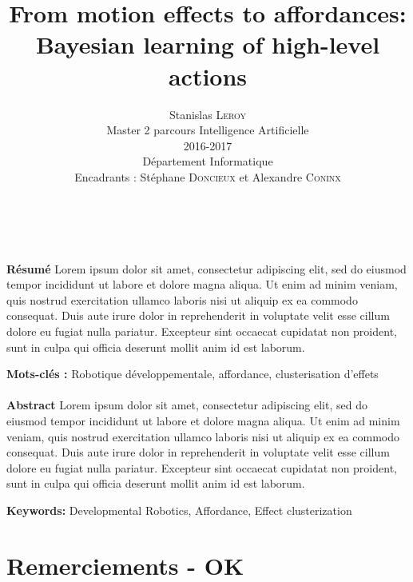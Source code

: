 \documentclass[draft]{llncs}
\begin{document}
\title{From motion effects to affordances: Bayesian learning of high-level actions}

\author{Stanislas \textsc{Leroy}\\
   Master 2 parcours Intelligence Artificielle\\
   2016-2017\\
   Département Informatique\\
   Encadrants : Stéphane \textsc{Doncieux} et Alexandre \textsc{Coninx}}


\maketitle

\ \\\\\textbf{Résumé} Lorem ipsum dolor sit amet, consectetur adipiscing elit, sed do eiusmod tempor incididunt ut labore et dolore magna aliqua. Ut enim ad minim veniam, quis nostrud exercitation ullamco laboris nisi ut aliquip ex ea commodo consequat. Duis aute irure dolor in reprehenderit in voluptate velit esse cillum dolore eu fugiat nulla pariatur. Excepteur sint occaecat cupidatat non proident, sunt in culpa qui officia deserunt mollit anim id est laborum.

\textbf{Mots-clés :} Robotique développementale, affordance, clusterisation d'effets\\\\



\textbf{Abstract} Lorem ipsum dolor sit amet, consectetur adipiscing elit, sed do eiusmod tempor incididunt ut labore et dolore magna aliqua. Ut enim ad minim veniam, quis nostrud exercitation ullamco laboris nisi ut aliquip ex ea commodo consequat. Duis aute irure dolor in reprehenderit in voluptate velit esse cillum dolore eu fugiat nulla pariatur. Excepteur sint occaecat cupidatat non proident, sunt in culpa qui officia deserunt mollit anim id est laborum.

\textbf{Keywords:} Developmental Robotics, Affordance, Effect clusterization




\section*{Remerciements - OK}
\end{document}
